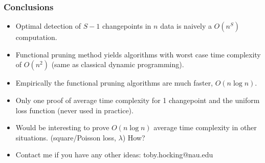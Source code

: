 \documentclass{beamer}
\begin{document}
\begin{frame}[fragile]
  \frametitle{Conclusions}

  \begin{itemize}
  \item Optimal detection of $S-1$ changepoints in $n$ data is naively
    a $O(n^S)$ computation.  
  \item Functional pruning method yields algorithms with worst case
    time complexity of $O(n^2)$ (same as classical dynamic
    programming).
  \item Empirically the functional pruning algorithms are much faster,
    $O(n\log n)$.
  \item Only one proof of average time complexity for 1 changepoint
    and the uniform loss function (never used in practice).
  \item Would be interesting to prove $O(n\log n)$ average time complexity in
    other situations. (square/Poisson loss, $\lambda$) How?
  \item Contact me if you have any other ideas: toby.hocking@nau.edu
  \end{itemize}
  
\end{frame}
\end{document}
